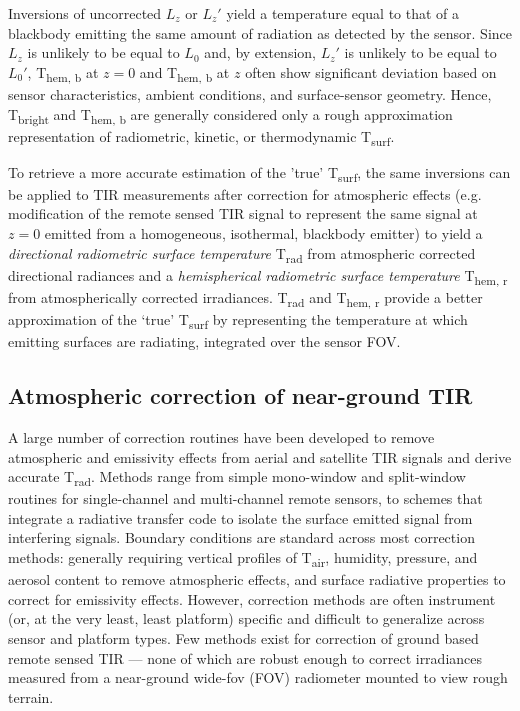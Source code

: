 Inversions of uncorrected $ L_z $ or \textbf{$L_z'$} yield a temperature equal to that of a blackbody emitting the same amount of radiation as detected by the sensor. Since $ L_z $ is unlikely to be equal to $ L_0 $ and, by extension,  $L_z'$ is unlikely to be equal to $L_0'$, T\textsubscript{hem, b} at $ z = 0 $ and T\textsubscript{hem, b} at $ z $ often show significant deviation based on sensor characteristics, ambient conditions, and surface-sensor geometry. Hence, T\textsubscript{bright} and T\textsubscript{hem, b} are generally considered only a rough approximation representation of radiometric, kinetic, or thermodynamic T\textsubscript{surf}.

To retrieve a more accurate estimation of the 'true' T\textsubscript{surf}, the same inversions can be applied to TIR measurements after correction for atmospheric effects (e.g. modification of the remote sensed TIR signal to represent the same signal at $ z = 0 $ emitted from a homogeneous, isothermal, blackbody emitter) to yield a \textit{directional radiometric surface temperature} T\textsubscript{rad} from atmospheric corrected directional radiances and a \textit{hemispherical radiometric surface temperature} T\textsubscript{hem, r} from atmospherically corrected irradiances. T\textsubscript{rad} and T\textsubscript{hem, r} provide a better approximation of the ‘true’ T\textsubscript{surf} by representing the temperature at which emitting surfaces are radiating, integrated over the sensor FOV.


\subsection{Atmospheric correction of near-ground TIR} \label{Atmospheric correction of near-ground TIR}

A large number of correction routines have been developed to remove atmospheric and emissivity effects from aerial and satellite TIR signals and derive accurate T\textsubscript{rad}. Methods range from simple mono-window \citep{Qin2001} and split-window \citep{Wan1996} routines for single-channel and multi-channel remote sensors, to schemes that integrate a radiative transfer code to isolate the surface emitted signal from interfering signals. Boundary conditions are standard across most correction methods: generally requiring vertical profiles of T\textsubscript{air}, humidity, pressure, and aerosol content to remove atmospheric effects, and surface radiative properties to correct for emissivity effects. However, correction methods are often instrument (or, at the very least, least platform) specific and difficult to generalize across sensor and platform types. Few methods exist for correction of ground based remote sensed TIR --- none of which are robust enough to correct irradiances measured from a near-ground wide-\gls{fov} (FOV) radiometer mounted to view rough terrain. 

